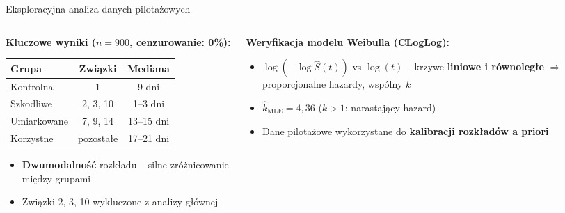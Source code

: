 \documentclass[aspectratio=169, 12pt]{beamer}
\begin{document}
\begin{frame}{Eksploracyjna analiza danych pilotażowych}
    \begin{columns}
        \begin{column}{0.48\textwidth}
            \textbf{Kluczowe wyniki ($n = 900$, cenzurowanie: 0\%):}
            \vspace{0.3em}
            \begin{tabular}{lcc}
                \toprule
                \textbf{Grupa} & \textbf{Związki} & \textbf{Mediana} \\
                \midrule
                Kontrolna    & 1         & 9 dni      \\
                Szkodliwe    & 2, 3, 10  & 1--3 dni   \\
                Umiarkowane  & 7, 9, 14  & 13--15 dni \\
                Korzystne    & pozostałe & 17--21 dni \\
                \bottomrule
            \end{tabular}
            \vspace{0.4em}
            \begin{itemize}
                \item \textbf{Dwumodalność} rozkładu -- silne zróżnicowanie między grupami
                \item Związki 2, 3, 10 wykluczone z analizy głównej
            \end{itemize}
        \end{column}
        \begin{column}{0.48\textwidth}
            \textbf{Weryfikacja modelu Weibulla (CLogLog):}
            \begin{itemize}
                \item $\log(-\log\hat{S}(t))$ vs $\log(t)$ -- krzywe \textbf{liniowe i równoległe} $\Rightarrow$ proporcjonalne hazardy, wspólny $k$
                \item $\hat{k}_{\mathrm{MLE}} = 4{,}36$ ($k > 1$: narastający hazard)
                \item Dane pilotażowe wykorzystane do \textbf{kalibracji rozkładów a priori}
            \end{itemize}
        \end{column}
    \end{columns}
\end{frame}
\end{document}

